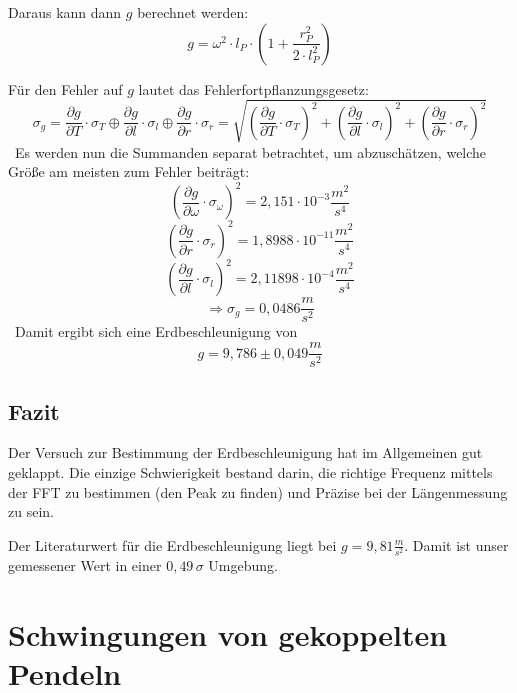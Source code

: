 \documentclass[a4paper, 11pt]{article}
\begin{document}
Daraus kann dann $g$ berechnet werden: 
\begin{equation*}
g = \omega^2 \cdot l_P \cdot (1+\frac{r_P^2}{2 \cdot l_P^2})   
\end{equation*}


Für den Fehler auf $g$ lautet das Fehlerfortpflanzungsgesetz:
\begin{equation*}
\sigma_g = \frac{\partial g}{\partial T}\cdot\sigma_T \oplus \frac{\partial g}{\partial l}\cdot\sigma_l \oplus \frac{\partial g}{\partial r}\cdot\sigma_r = \sqrt{\left(\frac{\partial g}{\partial T}\cdot\sigma_T\right)^2 + \left( \frac{\partial g}{\partial l}\cdot\sigma_l\right)^2+\left( \frac{\partial g}{\partial r}\cdot\sigma_r\right)^2} 
\end{equation*}\
Es werden nun die Summanden separat betrachtet, um abzuschätzen, welche Größe am meisten zum Fehler beiträgt:
\begin{equation*}
\left(\frac{\partial g}{\partial \omega}\cdot\sigma_{\omega}\right)^2 = 2,151 \cdot 10^{-3} \frac{m^2}{s^4} 
\end{equation*}
\begin{equation*}
\left(\frac{\partial g}{\partial r}\cdot\sigma_r\right)^2 = 1,8988 \cdot 10^{-11} \frac{m^2}{s^4} 
\end{equation*}
\begin{equation*}
\left(\frac{\partial g}{\partial l}\cdot\sigma_l\right)^2 = 2,11898 \cdot 10^{-4} \frac{m^2}{s^4}
\end{equation*}
\begin{equation*}
\Rightarrow \sigma_g = 0,0486 \frac{m}{s^2}
\end{equation*}\
Damit ergibt sich eine Erdbeschleunigung von
\begin{equation}
g = 9,786 \pm0,049 \frac{m}{s^2}
\end{equation}


\subsection{Fazit}
Der Versuch zur Bestimmung der Erdbeschleunigung hat im Allgemeinen gut geklappt. Die einzige Schwierigkeit bestand darin, die richtige Frequenz mittels der FFT zu bestimmen (den Peak zu finden) und Präzise bei der Längenmessung zu sein. 

Der Literaturwert für die Erdbeschleunigung liegt bei $g = 9,81 \frac{m}{s^2}$. Damit ist unser gemessener Wert in einer $0,49\, \sigma$ Umgebung. 

\clearpage
\section{Schwingungen von gekoppelten Pendeln}
\end{document}
